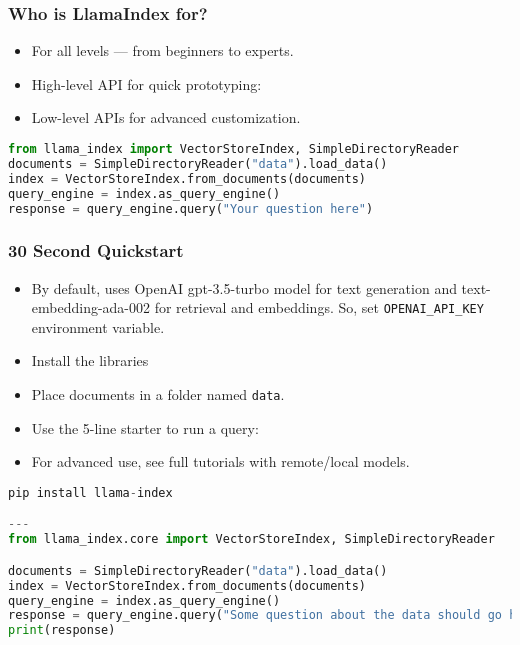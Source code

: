 \begin{frame}[fragile]\frametitle{Who is LlamaIndex for?}
\begin{itemize}
  \item For all levels — from beginners to experts.
  \item High-level API for quick prototyping:
  \item Low-level APIs for advanced customization.
\end{itemize}

\begin{lstlisting}[language=Python]
from llama_index import VectorStoreIndex, SimpleDirectoryReader
documents = SimpleDirectoryReader("data").load_data()
index = VectorStoreIndex.from_documents(documents)
query_engine = index.as_query_engine()
response = query_engine.query("Your question here")
\end{lstlisting}

\end{frame}

\begin{frame}[fragile]\frametitle{30 Second Quickstart}
\begin{itemize}
  \item By default, uses OpenAI gpt-3.5-turbo model for text generation and text-embedding-ada-002 for retrieval and embeddings. So, set \texttt{OPENAI\_API\_KEY} environment variable.
  \item Install the libraries
  \item Place documents in a folder named \texttt{data}.
  \item Use the 5-line starter to run a query:
  \item For advanced use, see full tutorials with remote/local models.
\end{itemize}

\begin{lstlisting}[language=Python]
pip install llama-index

---
from llama_index.core import VectorStoreIndex, SimpleDirectoryReader

documents = SimpleDirectoryReader("data").load_data()
index = VectorStoreIndex.from_documents(documents)
query_engine = index.as_query_engine()
response = query_engine.query("Some question about the data should go here")
print(response)
\end{lstlisting}
\end{frame}

